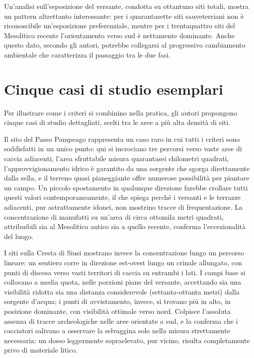 Un'analisi sull'esposizione del versante, condotta su ottantuno siti totali, mostra un pattern altrettanto interessante: per i quarantasette siti sauveterriani non è riconoscibile un'esposizione preferenziale, mentre per i trentaquattro siti del Mesolitico recente l'orientamento verso sud è nettamente dominante. Anche questo dato, secondo gli autori, potrebbe collegarsi al progressivo cambiamento ambientale che caratterizza il passaggio tra le due fasi.

\section{Cinque casi di studio esemplari}

Per illustrare come i criteri si combinino nella pratica, gli autori propongono cinque casi di studio dettagliati, scelti tra le aree a più alta densità di siti.

Il sito del Passo Pampeago rappresenta un caso raro in cui tutti i criteri sono soddisfatti in un unico punto: qui si incrociano tre percorsi verso vaste aree di caccia adiacenti, l'area sfruttabile misura quarantasei chilometri quadrati, l'approvvigionamento idrico è garantito da una sorgente che sgorga direttamente dalla sella, e il terreno quasi pianeggiante offre numerose possibilità per piantare un campo. Un piccolo spostamento in qualunque direzione farebbe crollare tutti questi valori contemporaneamente, il che spiega perché i versanti e le terrazze adiacenti, pur astrattamente idonei, non mostrino tracce di frequentazione. La concentrazione di manufatti su un'area di circa ottomila metri quadrati, attribuibili sia al Mesolitico antico sia a quello recente, conferma l'eccezionalità del luogo.

I siti sulla Cresta di Siusi mostrano invece la concentrazione lungo un percorso lineare: un sentiero corre in direzione est-ovest lungo un crinale allungato, con punti di discesa verso vasti territori di caccia su entrambi i lati. I campi base si collocano a media quota, nelle porzioni piane del versante, accettando sia una visibilità ridotta sia una distanza considerevole (settanta-ottanta metri) dalla sorgente d'acqua; i punti di avvistamento, invece, si trovano più in alto, in posizione dominante, con visibilità ottimale verso nord. Colpisce l'assoluta assenza di tracce archeologiche nelle aree orientate a sud, e la conferma che i cacciatori salivano a osservare la selvaggina solo nella misura strettamente necessaria: un dosso leggermente sopraelevato, pur vicino, risulta completamente privo di materiale litico.

